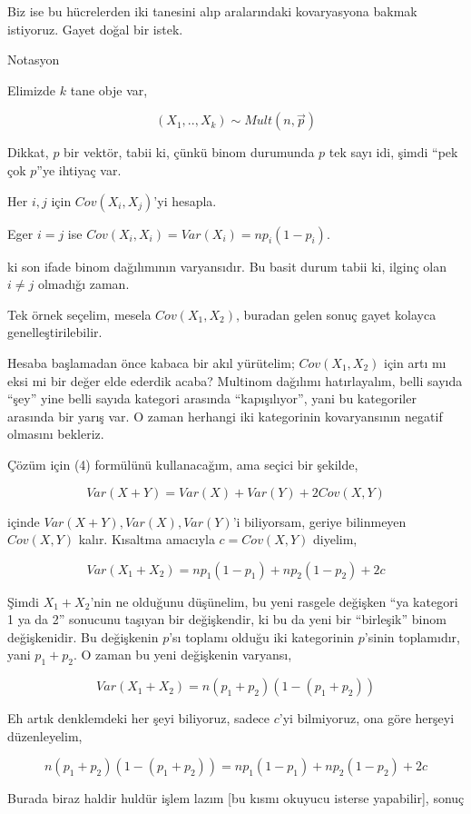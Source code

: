 \documentclass[12pt,fleqn]{article}\usepackage{../../common}
\begin{document}
Biz ise bu hücrelerden iki tanesini alıp aralarındaki kovaryasyona bakmak
istiyoruz. Gayet doğal bir istek. 

Notasyon

Elimizde $k$ tane obje var, 

$$ (X_1,..,X_k) \sim Mult(n,\vec{p}) $$

Dikkat, $p$ bir vektör, tabii ki, çünkü binom durumunda $p$ tek sayı idi,
şimdi ``pek çok $p$''ye ihtiyaç var. 

Her $i,j$ için $Cov(X_i,X_j)$'yi hesapla. 

Eger $i=j$ ise $Cov(X_i,X_i)=Var(X_i) = np_i(1-p_i)$. 

ki son ifade binom dağılımının varyansıdır. Bu basit durum tabii ki, ilginç
olan $i \ne j$ olmadığı zaman. 

Tek örnek seçelim, mesela $Cov(X_1,X_2)$, buradan gelen sonuç gayet kolayca
genelleştirilebilir. 

Hesaba başlamadan önce kabaca bir akıl yürütelim; $Cov(X_1,X_2)$ için artı
mı eksi mi bir değer elde ederdik acaba? Multinom dağılımı hatırlayalım,
belli sayıda ``şey'' yine belli sayıda kategori arasında ``kapışılıyor'',
yani bu kategoriler arasında bir yarış var. O zaman herhangi iki
kategorinin kovaryansının negatif olmasını bekleriz. 

Çözüm için (4) formülünü kullanacağım, ama seçici bir şekilde, 

$$ Var(X+Y) = Var(X) + Var(Y) + 2Cov(X,Y) $$

içinde $Var(X+Y),Var(X),Var(Y)$'i biliyorsam, geriye bilinmeyen $Cov(X,Y)$
kalır. Kısaltma amacıyla $c = Cov(X,Y)$ diyelim,

$$ Var(X_1+X_2) = np_1(1-p_1) + np_2(1-p_2) + 2c$$

Şimdi $X_1+X_2$'nin ne olduğunu düşünelim, bu yeni rasgele değişken ``ya
kategori 1 ya da 2'' sonucunu taşıyan bir değişkendir, ki bu da yeni bir
``birleşik'' binom değişkenidir. Bu değişkenin $p$'sı toplamı olduğu iki
kategorinin $p$'sinin toplamıdır, yani $p_1+p_2$. O zaman bu yeni
değişkenin varyansı, 

$$ Var(X_1+X_2) = n(p_1+p_2)(1-(p_1+p_2))  $$

Eh artık denklemdeki her şeyi biliyoruz, sadece $c$'yi bilmiyoruz, ona göre
herşeyi düzenleyelim, 

$$ n(p_1+p_2)(1-(p_1+p_2))  = np_1(1-p_1) + np_2(1-p_2) + 2c $$

Burada biraz haldir huldür işlem lazım [bu kısmı okuyucu isterse
yapabilir], sonuç
\end{document}
